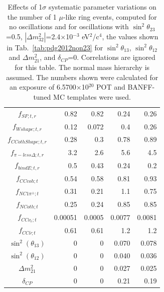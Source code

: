 \begin{table}
\begin{tabular}{| c || D{.}{.}{-1} | D{.}{.}{-1} || D{.}{.}{-1} | D{.}{.}{-1} |}
                $f_{SF; t, r}$ &            0.82 &            0.82 &            0.24 &            0.26  \\   
            $f_{Wshape; t, r}$ &            0.12 &           0.072 &             0.4 &            0.26  \\   
        $f_{CCothShape; t, r}$ &            0.28 &             0.3 &            0.78 &            0.89  \\   
    $f_{\pi-less\Delta; t, r}$ &             3.2 &             2.6 &             5.6 &             4.5  \\   
             $f_{bindE; t, r}$ &             0.5 &            0.43 &            0.24 &             0.2  \\   
                $f_{CCcoh; t}$ &            0.54 &            0.58 &            0.81 &            0.93  \\   
           $f_{NC1\pi^\pm; t}$ &            0.31 &            0.21 &             1.1 &            0.75  \\   
                $f_{NCoth; t}$ &            0.25 &            0.24 &            0.85 &            0.85  \\   
              $f_{CC\nu_e; t}$ &         0.00051 &          0.0005 &          0.0077 &          0.0081  \\   
          $f_{CC\bar{\nu}; t}$ &            0.61 &            0.61 &             1.2 &             1.2  \\   
\hline
         $\sin^2(\theta_{13})$ &               0 &               0 &           0.070 &           0.078  \\   
         $\sin^2(\theta_{12})$ &               0 &               0 &           0.040 &           0.036  \\   
             $\Delta m^2_{21}$ &               0 &               0 &           0.027 &           0.025  \\   
                 $\delta_{CP}$ &               0 &               0 &            0.21 &            0.19  \\   

 


\hline
\end{tabular}
\caption{
  Effects of 1$\sigma$ systematic parameter variations on
  the number of 1 $\mu$-like ring events,
  computed
  for no oscillations and
  for oscillations with
  $\sin^{2}\theta_{23}$=0.5, $|\Delta m^{2}_{32}|$=2.4$\times$10$^{-3}$ eV$^{2}$/c$^{4}$, the values shown in Tab.\
  \ref{tab:pdg2012non23} for $\sin^{2}\theta_{13}$, $\sin^{2}\theta_{12}$ and $\Delta m^{2}_{21}$,
  and $\delta_{CP}$=0. Correlations are ignored for this table. The normal mass hierarchy is assumed.
  The numbers shown were calculated for an exposure of 6.5700$\times$10$^{20}$ POT and BANFF-tuned MC templates were used.
}
\label{tab:nsk_systematic_table}
\end{table}
